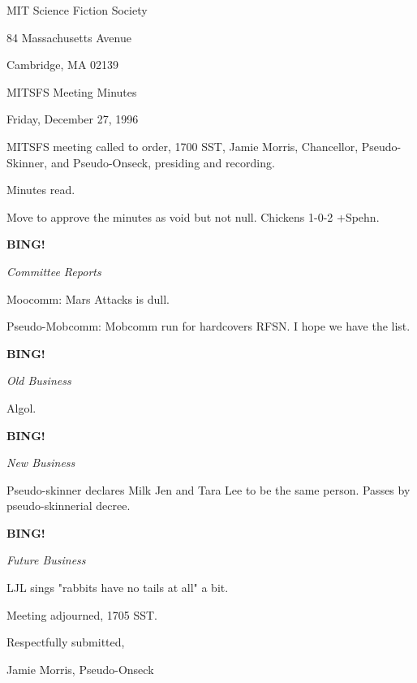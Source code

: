 \documentclass[12pt]{article}
\newcommand{\bing}{{\bf BING!} }
\newcommand{\goto}[1]{\bing \vskip 12pt \centerline{{\em{#1}}}}
\begin{document}
\begin{center}

MIT Science Fiction Society 

84 Massachusetts Avenue

Cambridge, MA 02139

\vspace{12pt}

MITSFS Meeting Minutes 

Friday, December 27, 1996

\end{center}
 
\vspace{18pt}

\setlength{\parskip}{6pt}

\noindent
MITSFS meeting called to order, 1700 SST,
Jamie Morris, Chancellor, Pseudo-Skinner, and Pseudo-Onseck, presiding and recording.

Minutes read.

Move to approve the minutes as void but not null. Chickens 1-0-2 +Spehn.

\goto{Committee Reports}

Moocomm: Mars Attacks is dull.

Pseudo-Mobcomm: Mobcomm run for hardcovers RFSN. I hope we have the list.

\goto{Old Business}

Algol.

\goto{New Business}

Pseudo-skinner declares Milk Jen and Tara Lee to be the same person. Passes by pseudo-skinnerial decree.

\goto{Future Business}

LJL sings "rabbits have no tails at all" a bit.

\vspace{12pt}

\noindent
Meeting adjourned, 1705 SST.

\vspace{18pt}

\centerline{Respectfully submitted,}
\centerline{Jamie Morris, Pseudo-Onseck}
\end{document}

